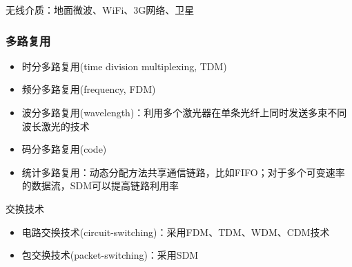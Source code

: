 无线介质：地面微波、WiFi、3G网络、卫星

\subsubsection{多路复用}
\begin{itemize}
	\item 时分多路复用(time division multiplexing, TDM)
	\item 频分多路复用(frequency, FDM)
	\item 波分多路复用(wavelength)：利用多个激光器在单条光纤上同时发送多束不同波长激光的技术
	\item 码分多路复用(code)
	\item 统计多路复用：动态分配方法共享通信链路，比如FIFO；对于多个可变速率的数据流，SDM可以提高链路利用率
\end{itemize}

交换技术
\begin{itemize}
	\item 电路交换技术(circuit-switching)：采用FDM、TDM、WDM、CDM技术
	\item 包交换技术(packet-switching)：采用SDM
\end{itemize}